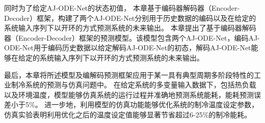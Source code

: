 
同时为了给定AJ-ODE-Net的状态初值，
本章基于编码器解码器（Encoder-Decoder）框架，构建了两个AJ-ODE-Net分别用于历史数据的编码以及在给定的系统输入序列下以开环的方式预测系统的未来输出。
本章提出了基于编码器解码器（Encoder-Decoder）框架的预测模型。该模型包含两个AJ-ODE-Net，编码AJ-ODE-Net用于编码历史数据以给定解码AJ-ODE-Net的初态，解码AJ-ODE-Net能够在给定的系统输入序列下以开环的方式预测系统的未来输出。

最后，本章将所述模型及编解码预测框架应用于某一具有典型周期多阶段特性的工业制冷系统的预测与仿真问题中。
在给定系统的多变量输入数据下，包括热负载以及环境温度，模型能够仿真系统的运行过程并准确地预测系统能耗，能耗预测误差小于5\%。
进一步地，利用模型的仿真功能能够优化系统的制冷温度设定参数，仿真实验表明利用优化之后的温度设定值能够显著节省超过6-25\%的制冷能耗。






